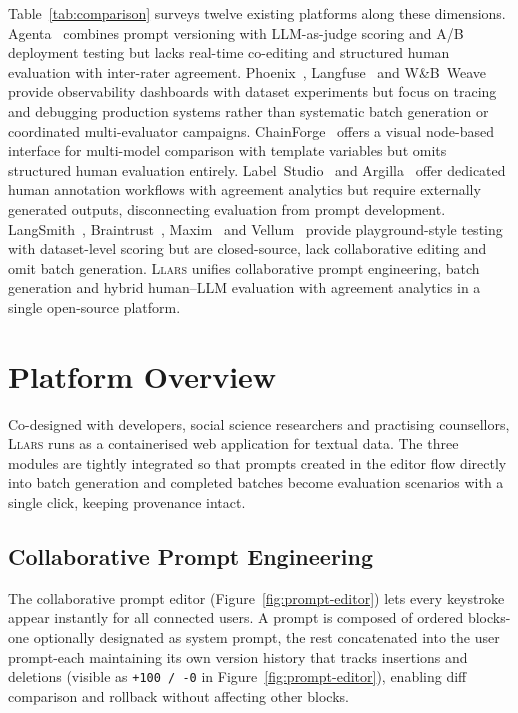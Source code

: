 \documentclass{article}
\begin{document}
Table~\ref{tab:comparison} surveys twelve existing platforms along these dimensions.
Agenta~\cite{agenta2024} combines prompt versioning with LLM-as-judge scoring and A/B deployment testing but lacks real-time co-editing and structured human evaluation with inter-rater agreement.
Phoenix~\cite{phoenix2024}, Langfuse~\cite{langfuse2024} and W\&B~Weave~\cite{weave2024} provide observability dashboards with dataset experiments but focus on tracing and debugging production systems rather than systematic batch generation or coordinated multi-evaluator campaigns.
ChainForge~\cite{arawjo2024chainforge} offers a visual node-based interface for multi-model comparison with template variables but omits structured human evaluation entirely.
Label~Studio~\cite{labelstudio2024} and Argilla~\cite{argilla2024} offer dedicated human annotation workflows with agreement analytics but require externally generated outputs, disconnecting evaluation from prompt development.
LangSmith~\cite{langsmith2024}, Braintrust~\cite{braintrust2024}, Maxim~\cite{maxim2024} and Vellum~\cite{vellum2024} provide playground-style testing with dataset-level scoring but are closed-source, lack collaborative editing and omit batch generation.
\textsc{Llars} unifies collaborative prompt engineering, batch generation and hybrid human--LLM evaluation with agreement analytics in a single open-source platform.


\section{Platform Overview}

Co-designed with developers, social science researchers and practising counsellors, \textsc{Llars} runs as a containerised web application for textual data.
The three modules are tightly integrated so that prompts created in the editor flow directly into batch generation and completed batches become evaluation scenarios with a single click, keeping provenance intact.

\subsection{Collaborative Prompt Engineering}

The collaborative prompt editor (Figure~\ref{fig:prompt-editor}) lets every keystroke appear instantly for all connected users.
A prompt is composed of ordered blocks\--one optionally designated as system prompt, the rest concatenated into the user prompt\--each maintaining its own version history that tracks insertions and deletions (visible as \texttt{+100\,/\,{-}0} in Figure~\ref{fig:prompt-editor}), enabling diff comparison and rollback without affecting other blocks.
\end{document}
